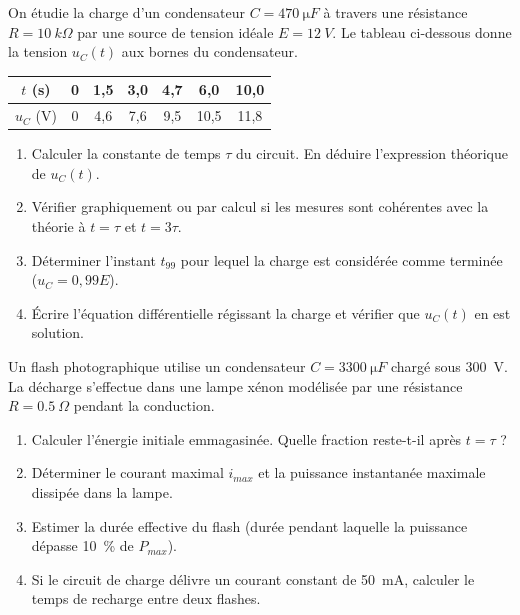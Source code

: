 \documentclass[11pt]{article}
\begin{document}
\begin{exercice}
On étudie la charge d'un condensateur $C = \SI{470}{\micro F}$ à travers une résistance $R = \SI{10}{k\Omega}$ par une source de tension idéale $E = \SI{12}{V}$. Le tableau ci-dessous donne la tension $u_C(t)$ aux bornes du condensateur.
\begin{center}
\begin{tabular}{|c|c|c|c|c|c|c|}
\hline
$t$ (s) & 0 & 1,5 & 3,0 & 4,7 & 6,0 & 10,0 \\
\hline
$u_C$ (V) & 0 & 4,6 & 7,6 & 9,5 & 10,5 & 11,8 \\
\hline
\end{tabular}
\end{center}
\begin{enumerate}
    \item Calculer la constante de temps $\tau$ du circuit. En déduire l'expression théorique de $u_C(t)$.
    \item Vérifier graphiquement ou par calcul si les mesures sont cohérentes avec la théorie à $t = \tau$ et $t = 3\tau$.
    \item Déterminer l'instant $t_{99}$ pour lequel la charge est considérée comme terminée ($u_C = 0,99 E$).
    \item Écrire l'équation différentielle régissant la charge et vérifier que $u_C(t)$ en est solution.
\end{enumerate}
\end{exercice}

\begin{exercice}
Un flash photographique utilise un condensateur $C = \SI{3300}{\micro F}$ chargé sous \SI{300}{V}. La décharge s'effectue dans une lampe xénon modélisée par une résistance $R = \SI{0,5}{\Omega}$ pendant la conduction.
\begin{enumerate}
    \item Calculer l'énergie initiale emmagasinée. Quelle fraction reste-t-il après $t = \tau$ ?
    \item Déterminer le courant maximal $i_{max}$ et la puissance instantanée maximale dissipée dans la lampe.
    \item Estimer la durée effective du flash (durée pendant laquelle la puissance dépasse \SI{10}{\%} de $P_{max}$).
    \item Si le circuit de charge délivre un courant constant de \SI{50}{mA}, calculer le temps de recharge entre deux flashes.
\end{enumerate}
\end{exercice}
\end{document}
